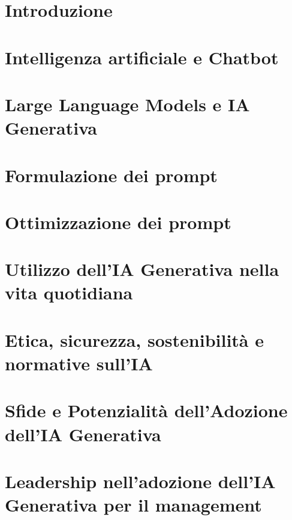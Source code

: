 \section{Introduzione}

\section{Intelligenza artificiale e Chatbot}

\section{Large Language Models e IA Generativa}

\section{Formulazione dei prompt}

\section{Ottimizzazione dei prompt}

\section{Utilizzo dell'IA Generativa nella vita quotidiana}

\section{Etica, sicurezza, sostenibilità e normative sull'IA}

\section{Sfide e Potenzialità dell'Adozione dell'IA Generativa}

\section{Leadership nell'adozione dell'IA Generativa per il management}

